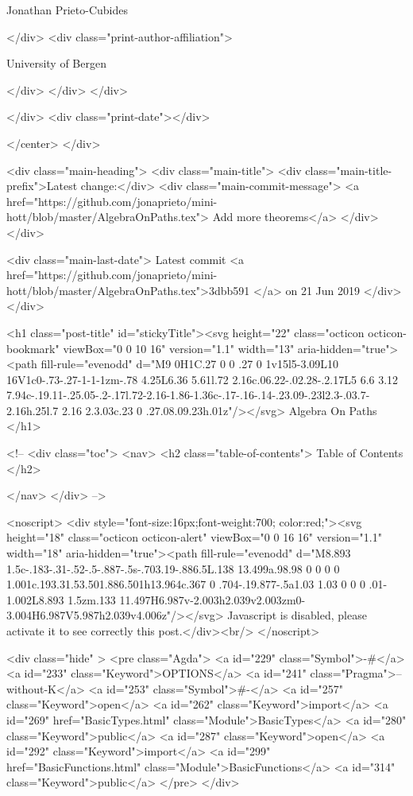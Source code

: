                   Jonathan Prieto-Cubides
                
              </div>
              <div class="print-author-affiliation">
                
                  University of Bergen
                
                </div>
            </div>
          </div>
          
          
        </div>
        <div class="print-date"></div>
        
        
    </center>
  </div>

  
  <div class="main-heading">
    <div class="main-title">
      <div class="main-title-prefix">Latest change:</div>
      <div class="main-commit-message">
            <a href="https://github.com/jonaprieto/mini-hott/blob/master/AlgebraOnPaths.tex">
              Add more theorems</a>
      </div>
    </div>

    <div class="main-last-date">
      Latest commit <a href="https://github.com/jonaprieto/mini-hott/blob/master/AlgebraOnPaths.tex">3dbb591 </a> on  21 Jun 2019
    </div>
  </div>
  
  <h1 class="post-title" id="stickyTitle"><svg height="22" class="octicon octicon-bookmark" viewBox="0 0 10 16" version="1.1" width="13" aria-hidden="true"><path fill-rule="evenodd" d="M9 0H1C.27 0 0 .27 0 1v15l5-3.09L10 16V1c0-.73-.27-1-1-1zm-.78 4.25L6.36 5.61l.72 2.16c.06.22-.02.28-.2.17L5 6.6 3.12 7.94c-.19.11-.25.05-.2-.17l.72-2.16-1.86-1.36c-.17-.16-.14-.23.09-.23l2.3-.03.7-2.16h.25l.7 2.16 2.3.03c.23 0 .27.08.09.23h.01z"/></svg> Algebra On Paths
  </h1>

  <!-- 
  <div class="toc">
    <nav>
    <h2 class="table-of-contents"> Table of Contents </h2>
      

    </nav>
  </div>
   -->

  <noscript>
  <div style="font-size:16px;font-weight:700; color:red;"><svg height="18" class="octicon octicon-alert" viewBox="0 0 16 16" version="1.1" width="18" aria-hidden="true"><path fill-rule="evenodd" d="M8.893 1.5c-.183-.31-.52-.5-.887-.5s-.703.19-.886.5L.138 13.499a.98.98 0 0 0 0 1.001c.193.31.53.501.886.501h13.964c.367 0 .704-.19.877-.5a1.03 1.03 0 0 0 .01-1.002L8.893 1.5zm.133 11.497H6.987v-2.003h2.039v2.003zm0-3.004H6.987V5.987h2.039v4.006z"/></svg> Javascript is disabled, please activate it to see correctly this post.</div><br/>
  </noscript>

  <div class="hide" >
<pre class="Agda">
<a id="229" class="Symbol">{-#</a> <a id="233" class="Keyword">OPTIONS</a> <a id="241" class="Pragma">--without-K</a> <a id="253" class="Symbol">#-}</a>
<a id="257" class="Keyword">open</a> <a id="262" class="Keyword">import</a> <a id="269" href="BasicTypes.html" class="Module">BasicTypes</a> <a id="280" class="Keyword">public</a>
<a id="287" class="Keyword">open</a> <a id="292" class="Keyword">import</a> <a id="299" href="BasicFunctions.html" class="Module">BasicFunctions</a> <a id="314" class="Keyword">public</a>
</pre>
</div>

